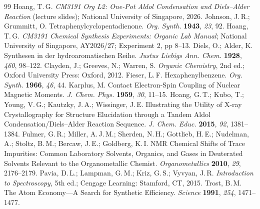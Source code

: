 \documentclass[11pt,a4paper]{article}
\begin{document}
\begin{thebibliography}{99}
\small
\setlength{\itemsep}{1pt}
 Hoang, T.\,G. \emph{CM3191 Org L2: One-Pot Aldol Condensation and Diels--Alder Reaction} (lecture slides); National University of Singapore, 2026.
 Johnson, J.\,R.; Grummitt, O. Tetraphenylcyclopentadienone. \emph{Org. Synth.} \textbf{1943}, \emph{23}, 92.
 Hoang, T.\,G. \emph{CM3191 Chemical Synthesis Experiments: Organic Lab Manual}; National University of Singapore, AY2026/27; Experiment 2, pp 8--13.
 Diels, O.; Alder, K. Synthesen in der hydroaromatischen Reihe. \emph{Justus Liebigs Ann. Chem.} \textbf{1928}, \emph{460}, 98--122.
 Clayden, J.; Greeves, N.; Warren, S. \emph{Organic Chemistry}, 2nd ed.; Oxford University Press: Oxford, 2012.
 Fieser, L.\,F. Hexaphenylbenzene. \emph{Org. Synth.} \textbf{1966}, \emph{46}, 44.
 Karplus, M. Contact Electron-Spin Coupling of Nuclear Magnetic Moments. \emph{J. Chem. Phys.} \textbf{1959}, \emph{30}, 11--15.
 Hoang, G.\,T.; Kubo, T.; Young, V.\,G.; Kautzky, J.\,A.; Wissinger, J.\,E. Illustrating the Utility of X-ray Crystallography for Structure Elucidation through a Tandem Aldol Condensation/Diels--Alder Reaction Sequence. \emph{J. Chem. Educ.} \textbf{2015}, \emph{92}, 1381--1384.
 Fulmer, G.\,R.; Miller, A.\,J.\,M.; Sherden, N.\,H.; Gottlieb, H.\,E.; Nudelman, A.; Stoltz, B.\,M.; Bercaw, J.\,E.; Goldberg, K.\,I. NMR Chemical Shifts of Trace Impurities: Common Laboratory Solvents, Organics, and Gases in Deuterated Solvents Relevant to the Organometallic Chemist. \emph{Organometallics} \textbf{2010}, \emph{29}, 2176--2179.
 Pavia, D.\,L.; Lampman, G.\,M.; Kriz, G.\,S.; Vyvyan, J.\,R. \emph{Introduction to Spectroscopy}, 5th ed.; Cengage Learning: Stamford, CT, 2015.
 Trost, B.\,M. The Atom Economy---A Search for Synthetic Efficiency. \emph{Science} \textbf{1991}, \emph{254}, 1471--1477.
\end{thebibliography}
\end{document}
